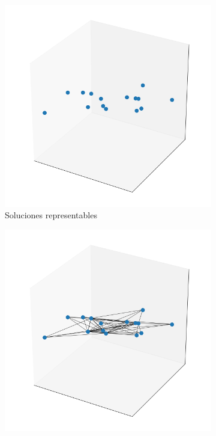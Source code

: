 \begin{figure}
\begin{subfigure}{.4\textwidth}
    \includegraphics[scale=.5]{Imagenes/search1.png}
    \caption{Soluciones representables}
\end{subfigure}
\begin{subfigure}{.5\textwidth}
    \includegraphics[scale=.5]{Imagenes/search2.png}

\end{subfigure}
\end{figure}

